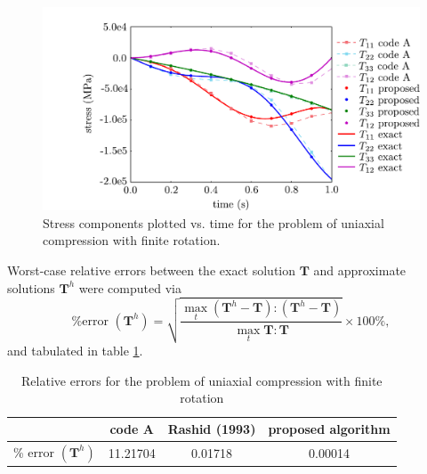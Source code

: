 \begin{figure}
\centering
\includegraphics[scale=0.75]{src/media/stretch_rotate}
\caption{Stress components plotted vs. time for the problem of uniaxial compression with finite rotation.}
\label{fig.v1-cm1}
\end{figure}

Worst-case relative errors between the exact solution $\mathbf{T}$ and approximate solutions $\mathbf{T}^h$ were computed via
\begin{equation}
    \text{\% error } (\mathbf{T}^h) = \sqrt{\frac{\max_{t} (\mathbf{T}^h - \mathbf{T}) \colon (\mathbf{T}^h - \mathbf{T})}{\max_{t} \mathbf{T} \colon \mathbf{T}}} \times 100 \% ,
    \label{eq:relative_error}
\end{equation}
and tabulated in table \ref{tab.v1-cm1}.

\begin{table}[]
\centering
\caption{Relative errors for the problem of uniaxial compression with finite rotation}
\label{tab.v1-cm1}
\begin{tabular}{c|c|c|c}
& code A & Rashid (1993) & proposed algorithm  \\ \hline
\% error $(\mathbf{T}^h)$ & 11.21704 & 0.01718 & 0.00014
\end{tabular}
\end{table}

\FloatBarrier
